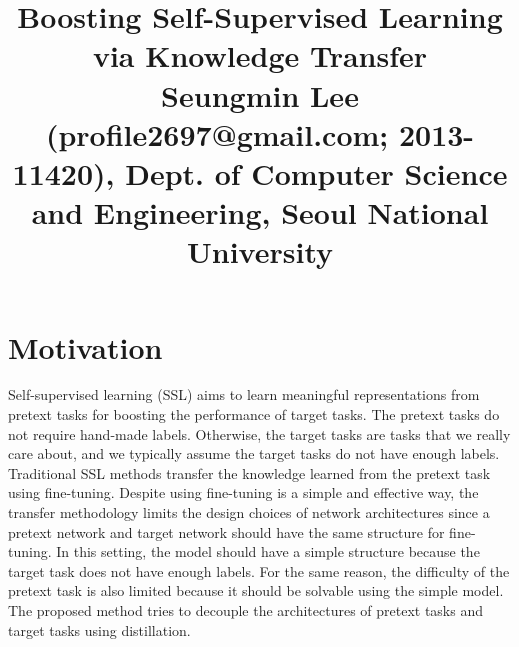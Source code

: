 \documentclass[10pt,twocolumn,letterpaper]{article}
\begin{document}
\title{Boosting Self-Supervised Learning via Knowledge Transfer
	 \\ {\rm {\normalsize Seungmin Lee (profile2697@gmail.com; 2013-11420), Dept. of Computer Science and Engineering, Seoul National University}}} 

\maketitle
\thispagestyle{empty}


\section{Motivation}
Self-supervised learning (SSL) aims to learn meaningful representations from pretext tasks for boosting the performance of target tasks. The pretext tasks do not require hand-made labels. Otherwise, the target tasks are tasks that we really care about, and we typically assume the target tasks do not have enough labels. Traditional SSL methods transfer the knowledge learned from the pretext task using fine-tuning. Despite using fine-tuning is a simple and effective way, the transfer methodology limits the design choices of network architectures since a pretext network and target network should have the same structure for fine-tuning. In this setting, the model should have a simple structure because the target task does not have enough labels. For the same reason, the difficulty of the pretext task is also limited because it should be solvable using the simple model. The proposed method tries to decouple the architectures of pretext tasks and target tasks using distillation.
 



{\small

%
}
\end{document}
